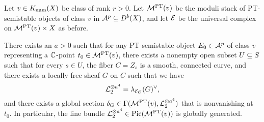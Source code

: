 Let $v \in K_{\mathrm{num}}(X)$ be class of rank $r > 0$. Let $\mathcal{M}^{\mathrm{PT}}(v)$ be the moduli stack of PT-semistable objects of class $v$ in $\mathcal{A}^p \subseteq D^b(X)$, and let $\mathcal{E}$ be the universal complex on $\mathcal{M}^{\mathrm{PT}}(v) \times X$ as before.
\begin{thm}\label{globgen}
    There exists an $a > 0$ such that for any PT-semistable object $E_0 \in \mathcal{A}^p$ of class $v$ representing a $\mathbb{C}$-point $t_0 \in \mathcal{M}^{\mathrm{PT}}(v)$, there exists a nonempty open subset $U \subseteq S$ such that for every $s \in U$, the fiber $C = Z_s$ is a smooth, connected curve, and there exists a locally free sheaf $G$ on $C$ such that we have
    \[ \mathcal{L}_2^{\otimes a^4} = \lambda_{\mathcal{E}_C}(G)^\vee, \]
    and there exists a global section $\delta_G \in \Gamma(\mathcal{M}^{\mathrm{PT}}(v), \mathcal{L}_2^{\otimes a^4})$ that is nonvanishing at $t_0$. In particular, the line bundle $\mathcal{L}_2^{\otimes a^4} \in \mathrm{Pic}(\mathcal{M}^{\mathrm{PT}}(v))$ is globally generated. 
\end{thm}
